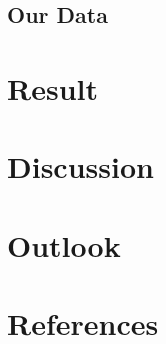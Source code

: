 \documentclass[
  parskip,
  oneside]{scrreprt}
\begin{document}
\hypertarget{our-data}{%
\section{Our Data}\label{our-data}}

\tableofcontents

\hypertarget{result}{%
\chapter{Result}\label{result}}

\hypertarget{discussion}{%
\chapter{Discussion}\label{discussion}}

\hypertarget{outlook}{%
\chapter{Outlook}\label{outlook}}

\hypertarget{references}{%
\chapter{References}\label{references}}
\end{document}
